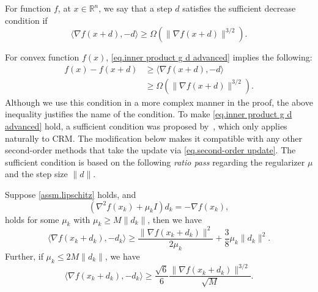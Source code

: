 \documentclass{article}
\begin{document}







\begin{definition}
    \label{def.sufficient decrease condition}
    For function $f$, at $x\in\mathbb{R}^n$, we say that a step $d$ satisfies the sufficient decrease condition if
    \begin{equation}
        \label{eq.inner product g d advanced}
        \langle \nabla f(x+d),-d \rangle \geq \Omega\left(\|\nabla f(x+d)\|^{3/2}\right).
    \end{equation}
\end{definition}
For convex function $f(x)$, \eqref{eq.inner product g d advanced} implies the following:
\begin{equation*}
    \begin{aligned}
        f(x)-f(x+d) & \geq \langle \nabla f(x+d),-d \rangle            \\
                    & \geq \Omega\left(\|\nabla f(x+d)\|^{3/2}\right).
    \end{aligned}
\end{equation*}
Although we use this condition in a more complex manner in the proof, the above inequality justifies the name of the condition. To make \eqref{eq.inner product g d advanced} hold, a sufficient condition was proposed by~\citet[Lemma 6]{nesterov2008accelerating}, which only applies naturally to CRM. The modification below makes it compatible with any other second-order methods that take the update via \eqref{eq.second-order update}. The sufficient condition is based on the following \emph{ratio pass} regarding the regularizer $\mu$ and the step size $\|d\|$.
\begin{lemma}
    \label{lem.inner product g and d}
    Suppose \autoref{assm.lipschitz} holds, and 
    \begin{equation}
        \label{eq.regularized condition for d}
        \left (\nabla^2 f(x_k)+\mu_k I\right)d_k = -\nabla f(x_k),
    \end{equation}
    holds for some $\mu_k$ with $\mu_k\geq M \|d_k\|$, then we have
    \begin{equation}
        \label{eq.inner product g d}
        \langle \nabla f(x_k+d_k),-d_k \rangle \geq \frac{\|\nabla f(x_k+d_k)\|^2}{2\mu_k}+\frac{3}{8}\mu_k \|d_k\|^2.
    \end{equation}
    Further, if $\mu_k \leq 2M\|d_k\|$, we have
    \begin{equation}
        \label{eq.inner product g d advanced}
        \langle \nabla f(x_k+d_k),-d_k \rangle \geq \frac{\sqrt{6}}{6} \frac{\|\nabla f(x_k+d_k)\|^{3/2}}{\sqrt{M}}.
    \end{equation}
\end{lemma}
\end{document}
